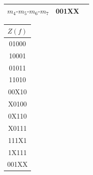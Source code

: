 \documentclass{article}
\begin{document}
\begin{center}
\begin{tabular}[t]{|lcc|}
$m_{4}\mbox{-}m_{5}\mbox{-}m_{6}\mbox{-}m_{7}$ & 001XX& \\\hline
\end{tabular}
\begin{tabular}[t]{|c|}
\hline $Z(f)$ \\ \hline
01000\\
10001\\
01011\\
11010\\
00X10\\
X0100\\
0X110\\
X0111\\
111X1\\
1X111\\
001XX\\
\hline \end{tabular}
\end{center}
\end{document}
